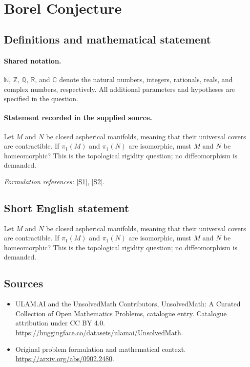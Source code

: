 \documentclass[11pt]{article}
\newcommand{\sref}[2]{\hyperlink{source:#1:#2}{[S#2]}}
\begin{document}
\section{Borel Conjecture}\label{statement}

\subsection{Definitions and mathematical statement}

\paragraph{Shared notation.}$\mathbb N$, $\mathbb Z$, $\mathbb Q$, $\mathbb R$, and $\mathbb C$ denote the natural numbers, integers, rationals, reals, and complex numbers, respectively. All additional parameters and hypotheses are specified in the question.


\paragraph{Statement recorded in the supplied source.}
Let $M$ and $N$ be closed aspherical manifolds, meaning that their universal covers are contractible. If $\pi_1(M)$ and $\pi_1(N)$ are isomorphic, must $M$ and $N$ be homeomorphic? This is the topological rigidity question; no diffeomorphism is demanded.
\par\smallskip\textit{Formulation references:} \sref{statement}{1}, \sref{statement}{2}.
\subsection{Short English statement}
Let $M$ and $N$ be closed aspherical manifolds, meaning that their universal covers are contractible. If $\pi_1(M)$ and $\pi_1(N)$ are isomorphic, must $M$ and $N$ be homeomorphic? This is the topological rigidity question; no diffeomorphism is demanded.
\subsection{Sources}
\begin{itemize}
\item[\hypertarget{source:statement:1}{S1}] ULAM.AI and the UnsolvedMath Contributors, UnsolvedMath: A Curated Collection of Open Mathematics Problems, catalogue entry. Catalogue attribution under CC BY 4.0.
\url{https://huggingface.co/datasets/ulamai/UnsolvedMath}.
\item[\hypertarget{source:statement:2}{S2}] Original problem formulation and mathematical context.
\url{https://arxiv.org/abs/0902.2480}.
\end{itemize}
\label{end:statement}
\end{document}
